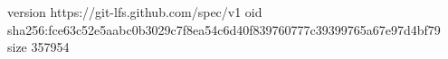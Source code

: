 version https://git-lfs.github.com/spec/v1
oid sha256:fce63c52e5aabc0b3029c7f8ea54c6d40f839760777c39399765a67e97d4bf79
size 357954
